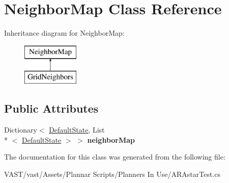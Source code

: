 \hypertarget{class_neighbor_map}{\section{Neighbor\-Map Class Reference}
\label{class_neighbor_map}
}
Inheritance diagram for Neighbor\-Map\-:\begin{figure}[H]
\begin{center}
\leavevmode
\includegraphics[height=2.000000cm]{class_neighbor_map}
\end{center}
\end{figure}
\subsection*{Public Attributes}
\begin{DoxyCompactItemize}
\item 
\hypertarget{class_neighbor_map_a420488d93080691ce0dd6791a48d817c}{Dictionary$<$ \hyperlink{class_default_state}{Default\-State}, List\\*
$<$ \hyperlink{class_default_state}{Default\-State} $>$ $>$ {\bfseries neighbor\-Map}}\label{class_neighbor_map_a420488d93080691ce0dd6791a48d817c}

\end{DoxyCompactItemize}


The documentation for this class was generated from the following file\-:\begin{DoxyCompactItemize}
\item 
V\-A\-S\-T/vast/\-Assets/\-Plannar Scripts/\-Planners In Use/A\-R\-Astar\-Test.\-cs\end{DoxyCompactItemize}
